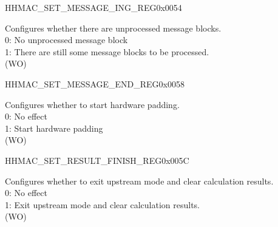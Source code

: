 \begin{register}{H}{HMAC\_SET\_MESSAGE\_ING\_REG}{0x0054}\label{regdesc:HMACSETMESSAGEINGREG}
%
%
\regnewline%
\begin{regdesc}\begin{reglist}
\label{fielddesc:HMACSETTEXTING}\item [HMAC\_SET\_TEXT\_ING] Configures whether there are unprocessed message blocks.
\\0: No unprocessed message block
\\1: There are still some message blocks to be processed.
\\(WO)
\end{reglist}\end{regdesc}
\end{register}


\begin{register}{H}{HMAC\_SET\_MESSAGE\_END\_REG}{0x0058}\label{regdesc:HMACSETMESSAGEENDREG}
%
%
\regnewline%
\begin{regdesc}\begin{reglist}
\label{fielddesc:HMACSETTEXTEND}\item [HMAC\_SET\_TEXT\_END] Configures whether to start hardware padding.
\\0: No effect
\\1: Start hardware padding
\\(WO)
\end{reglist}\end{regdesc}
\end{register}


\begin{register}{H}{HMAC\_SET\_RESULT\_FINISH\_REG}{0x005C}\label{regdesc:HMACSETRESULTFINISHREG}
%
%
\regnewline%
\begin{regdesc}\begin{reglist}
\label{fielddesc:HMACSETRESULTEND}\item [HMAC\_SET\_RESULT\_END] Configures whether to exit upstream mode and clear calculation results.
\\0: No effect
\\1: Exit upstream mode and clear calculation results.
\\(WO)
\end{reglist}\end{regdesc}
\end{register}


